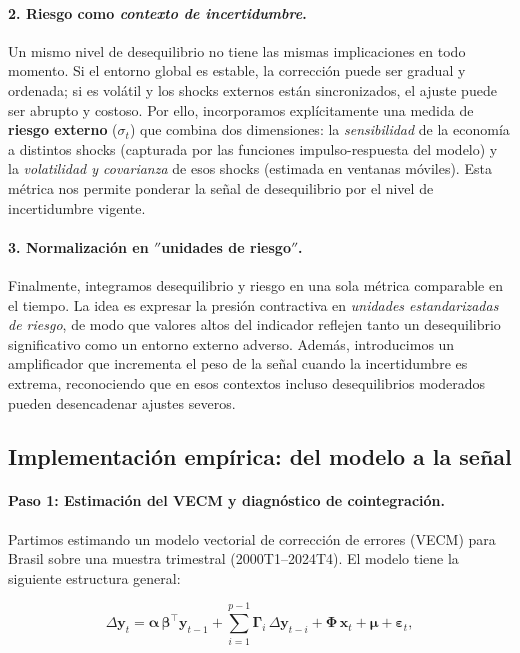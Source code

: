 \documentclass[11pt,a4paper]{article}
\numberwithin{equation}{section}
\newcommand{\vect}[1]{\boldsymbol{#1}}
\begin{document}
\paragraph{2. Riesgo como \textit{contexto de incertidumbre}.}
Un mismo nivel de desequilibrio no tiene las mismas implicaciones en todo momento. Si el entorno global es estable, la corrección puede ser gradual y ordenada; si es volátil y los shocks externos están sincronizados, el ajuste puede ser abrupto y costoso. Por ello, incorporamos explícitamente una medida de \textbf{riesgo externo} ($\sigma_t$) que combina dos dimensiones: la \textit{sensibilidad} de la economía a distintos shocks (capturada por las funciones impulso-respuesta del modelo) y la \textit{volatilidad y covarianza} de esos shocks (estimada en ventanas móviles). Esta métrica nos permite ponderar la señal de desequilibrio por el nivel de incertidumbre vigente.

\paragraph{3. Normalización en $''$unidades de riesgo$''$.}
Finalmente, integramos desequilibrio y riesgo en una sola métrica comparable en el tiempo. La idea es expresar la presión contractiva en \textit{unidades estandarizadas de riesgo}, de modo que valores altos del indicador reflejen tanto un desequilibrio significativo como un entorno externo adverso. Además, introducimos un amplificador que incrementa el peso de la señal cuando la incertidumbre es extrema, reconociendo que en esos contextos incluso desequilibrios moderados pueden desencadenar ajustes severos.

\subsection{Implementación empírica: del modelo a la señal}

\paragraph{Paso 1: Estimación del VECM y diagnóstico de cointegración.}
Partimos estimando un modelo vectorial de corrección de errores (VECM) para Brasil sobre una muestra trimestral (2000T1--2024T4). El modelo tiene la siguiente estructura general:

$$
\Delta \vect{y}_t = \vect{\alpha}\,\vect{\beta}^{\top}\vect{y}_{t-1} + \sum_{i=1}^{p-1}\vect{\Gamma}_i\,\Delta\vect{y}_{t-i} + \vect{\Phi}\,\vect{x}_t + \vect{\mu} + \vect{\varepsilon}_t,
$$
\end{document}
